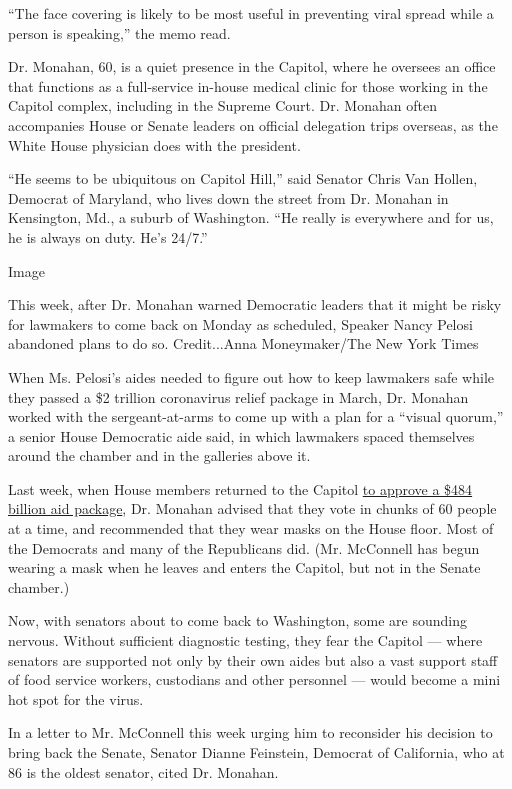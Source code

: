 ``The face covering is likely to be most useful in preventing viral
spread while a person is speaking,'' the memo read.

Dr. Monahan, 60, is a quiet presence in the Capitol, where he oversees
an office that functions as a full-service in-house medical clinic for
those working in the Capitol complex, including in the Supreme Court.
Dr. Monahan often accompanies House or Senate leaders on official
delegation trips overseas, as the White House physician does with the
president.

``He seems to be ubiquitous on Capitol Hill,'' said Senator Chris Van
Hollen, Democrat of Maryland, who lives down the street from Dr. Monahan
in Kensington, Md., a suburb of Washington. ``He really is everywhere
and for us, he is always on duty. He's 24/7.''

Image

This week, after Dr. Monahan warned Democratic leaders that it might be
risky for lawmakers to come back on Monday as scheduled, Speaker Nancy
Pelosi abandoned plans to do so. Credit...Anna Moneymaker/The New York
Times

When Ms. Pelosi's aides needed to figure out how to keep lawmakers safe
while they passed a \$2 trillion coronavirus relief package in March,
Dr. Monahan worked with the sergeant-at-arms to come up with a plan for
a ``visual quorum,'' a senior House Democratic aide said, in which
lawmakers spaced themselves around the chamber and in the galleries
above it.

Last week, when House members returned to the Capitol
\href{https://www.nytimes.com/2020/04/23/us/politics/house-passes-relief-for-small-businesses-and-aid-for-hospitals-and-testing.html}{to
approve a \$484 billion aid package}, Dr. Monahan advised that they vote
in chunks of 60 people at a time, and recommended that they wear masks
on the House floor. Most of the Democrats and many of the Republicans
did. (Mr. McConnell has begun wearing a mask when he leaves and enters
the Capitol, but not in the Senate chamber.)

Now, with senators about to come back to Washington, some are sounding
nervous. Without sufficient diagnostic testing, they fear the Capitol
--- where senators are supported not only by their own aides but also a
vast support staff of food service workers, custodians and other
personnel --- would become a mini hot spot for the virus.

In a letter to Mr. McConnell this week urging him to reconsider his
decision to bring back the Senate, Senator Dianne Feinstein, Democrat of
California, who at 86 is the oldest senator, cited Dr. Monahan.

